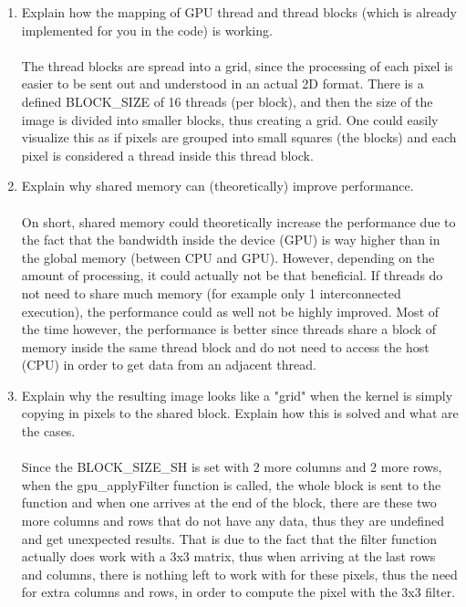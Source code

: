 \documentclass[english]{exam}
\begin{document}
\begin{enumerate}
\item Explain how the mapping of GPU thread and thread blocks (which is already implemented for you in the code) is working. \\\\
  The thread blocks are spread into a grid, since the processing of each pixel is easier to be sent out and understood in an actual 2D format. There is a defined BLOCK\_SIZE of 16 threads (per block), and then the size of the image is divided into smaller blocks, thus creating a grid. One could easily visualize this as if pixels are grouped into small squares (the blocks) and each pixel is considered a thread inside this thread block.
  
\item Explain why shared memory can (theoretically) improve performance.\\\\
  On short, shared memory could theoretically increase the performance due to the fact that the bandwidth inside the device (GPU) is way higher than in the global memory (between CPU and GPU). However, depending on the amount of processing, it could actually not be that beneficial. If threads do not need to share much memory (for example only 1 interconnected execution), the performance could as well not be highly improved. Most of the time however, the performance is better since threads share a block of memory inside the same thread block and do not need to access the host (CPU) in order to get data from an adjacent thread.
  
\item Explain why the resulting image looks like a "grid" when the kernel is simply copying in pixels to the shared block. Explain how this is solved and what are the cases.\\\\
  Since the BLOCK\_SIZE\_SH is set with 2 more columns and 2 more rows, when the gpu\_applyFilter function is called, the whole block is sent to the function and when one arrives at the end of the block, there are these two more columns and rows that do not have any data, thus they are undefined and get unexpected results. That is due to the fact that the filter function actually does work with a 3x3 matrix, thus when arriving at the last rows and columns, there is nothing left to work with for these pixels, thus the need for extra columns and rows, in order to compute the pixel with the 3x3 filter.
  

\end{enumerate}
\end{document}
